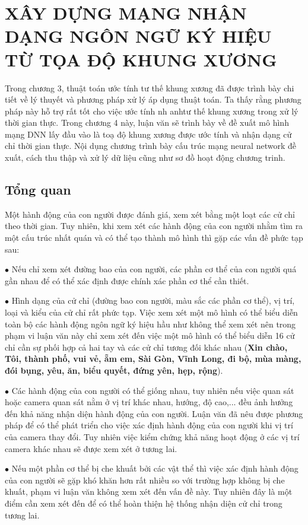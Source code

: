 \chapter{XÂY DỰNG MẠNG NHẬN DẠNG NGÔN NGỮ KÝ HIỆU TỪ TỌA ĐỘ KHUNG XƯƠNG}
\label{s:DNN}
Trong chương 3, thuật toán ước tính tư thế khung xương đã được trình bày chi tiết về lý thuyết và phương pháp xử lý áp dụng thuật toán. Ta thấy rằng phương pháp này hỗ trợ rất tốt cho việc ước tính nh anhtư thế khung xương trong xử lý thời gian thực. Trong chương 4 này, luận văn sẽ trình bày về đề xuất mô hình mạng DNN lấy đầu vào là toạ độ khung xương được ước tính và nhận dạng cử chỉ thời gian thực. Nội dụng chương trình bày cấu trúc mạng neural network đề xuất, cách thu thập và xử lý dữ liệu cũng như sơ đồ hoạt động chương trinh.
\section{Tổng quan}
Một hành động của con người được đánh giá, xem xét bằng một loạt các cử chỉ theo thời gian. Tuy nhiên, khi xem xét các hành động của con người nhằm tìm ra một cấu trúc nhất quán và có thể tạo thành mô hình thì gặp các vấn đề phức tạp sau:

$\bullet$ Nếu chỉ xem xét đường bao của con người, các phần cơ thể của con người quá gần nhau để có thể xác định được chính xác phần cơ thể cần thiết.

$\bullet$ Hình dạng của cử chỉ (đường bao con người, màu sắc các phần cơ thể), vị trí, loại và kiểu của cử chỉ rất phức tạp. Việc xem xét một mô hình có thể biểu diễn toàn bộ các hành động ngôn ngữ ký hiệu hầu như không thể xem xét nên trong phạm vi luận văn này chỉ xem xét đến việc một mô hình có thể biểu diễn 16 cử chỉ cần sự phối hợp cả hai tay và các cử chỉ tương đối khác nhau (\textbf{Xin chào, Tôi, thành phố, vui vẻ, ẵm em, Sài Gòn, Vĩnh Long, đi bộ, mùa màng, đói bụng, yêu, ăn, biểu quyết, đứng yên, hẹp, rộng}).

$\bullet$ Các hành động của con người có thể giống nhau, tuy nhiên nếu việc quan sát hoặc camera quan sát nằm ở vị trí khác nhau, hướng, độ cao,... đều ảnh hưởng đến khả năng nhận diện hành động của con người. Luận văn đã nêu được phương pháp để có thể phát triển cho việc xác định hành động của con người khi vị trí của camera thay đổi. Tuy nhiên việc kiểm chứng khả năng hoạt động ở các vị trí camera khác nhau sẽ được xem xét ở tương lai.

$\bullet$ Nếu một phần cơ thể bị che khuất bởi các vật thể thì việc xác định hành động của con người sẽ gặp khó khăn hơn rất nhiều so với trường hợp không bị che khuất, phạm vi luận văn không xem xét đến vấn đề này. Tuy nhiên đây là một điểm cần xem xét đến để có thể hoàn thiện hệ thống nhận diện cử chỉ trong tương lai.

